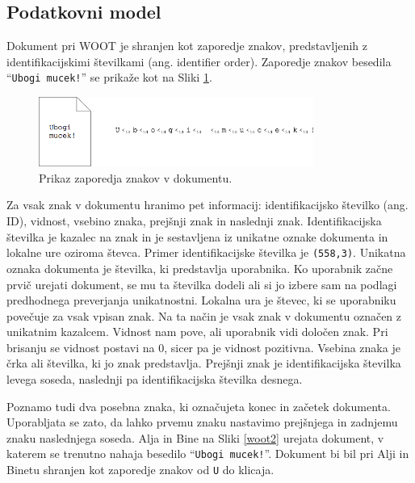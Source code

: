 \documentclass[a4paper, 12pt, twoside]{book}
\begin{document}
\subsection{Podatkovni model}
\label{subsec:pm}

Dokument pri WOOT je shranjen kot zaporedje znakov, predstavljenih z identifikacijskimi številkami (ang. identifier order). Zaporedje znakov besedila “{\tt Ubogi mucek!}” se prikaže kot na Sliki \ref{woot1}.

\begin{figure}[placement h]
\begin{center}
\includegraphics[width=9cm]{woot1.png}
\end{center}
\caption{Prikaz zaporedja znakov v dokumentu.}
\label{woot1}
\end{figure}

Za vsak znak v dokumentu hranimo pet informacij: identifikacijsko številko (ang. ID), vidnost, vsebino znaka, prejšnji znak in naslednji znak. Identifikacijska številka je kazalec na znak in je sestavljena iz unikatne oznake dokumenta in lokalne ure oziroma števca. Primer identifikacijske številka je {\tt (558,3)}. Unikatna oznaka dokumenta je številka, ki predstavlja uporabnika. Ko uporabnik začne prvič urejati dokument, se mu ta številka dodeli ali si jo izbere sam na podlagi predhodnega preverjanja unikatnostni. Lokalna ura je števec, ki se uporabniku povečuje za vsak vpisan znak. Na ta način je vsak znak v dokumentu označen z unikatnim kazalcem. Vidnost nam pove, ali uporabnik vidi določen znak. Pri brisanju se vidnost postavi na 0, sicer pa je vidnost pozitivna. Vsebina znaka je črka ali številka, ki jo znak predstavlja. Prejšnji znak je identifikacijska številka levega soseda, naslednji pa identifikacijska številka desnega.

Poznamo tudi dva posebna znaka, ki označujeta konec in začetek dokumenta. Uporabljata se zato, da lahko prvemu znaku nastavimo prejšnjega in zadnjemu znaku naslednjega soseda. Alja in Bine na Sliki \ref{woot2} urejata dokument, v katerem se trenutno nahaja besedilo “{\tt Ubogi mucek!}”. Dokument bi bil pri Alji in Binetu shranjen kot zaporedje znakov od {\tt U} do klicaja.
\end{document}
